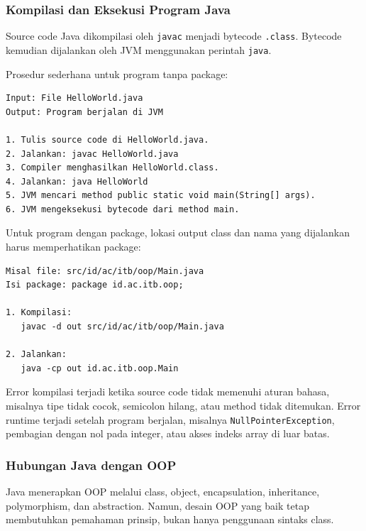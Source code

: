 \subsubsection{Kompilasi dan Eksekusi Program Java}

\begin{jawab}
Source code Java dikompilasi oleh \texttt{javac} menjadi bytecode \texttt{.class}. Bytecode kemudian dijalankan oleh JVM menggunakan perintah \texttt{java}.
\end{jawab}

Prosedur sederhana untuk program tanpa package:

\begin{lstlisting}[caption={Kompilasi dan eksekusi program tanpa package}, label={lst:compile-simple}]
Input: File HelloWorld.java
Output: Program berjalan di JVM

1. Tulis source code di HelloWorld.java.
2. Jalankan: javac HelloWorld.java
3. Compiler menghasilkan HelloWorld.class.
4. Jalankan: java HelloWorld
5. JVM mencari method public static void main(String[] args).
6. JVM mengeksekusi bytecode dari method main.
\end{lstlisting}

Untuk program dengan package, lokasi output class dan nama yang dijalankan harus memperhatikan package:

\begin{lstlisting}[caption={Kompilasi dan eksekusi program dengan package}, label={lst:compile-package}]
Misal file: src/id/ac/itb/oop/Main.java
Isi package: package id.ac.itb.oop;

1. Kompilasi:
   javac -d out src/id/ac/itb/oop/Main.java

2. Jalankan:
   java -cp out id.ac.itb.oop.Main
\end{lstlisting}

Error kompilasi terjadi ketika source code tidak memenuhi aturan bahasa, misalnya tipe tidak cocok, semicolon hilang, atau method tidak ditemukan. Error runtime terjadi setelah program berjalan, misalnya \texttt{NullPointerException}, pembagian dengan nol pada integer, atau akses indeks array di luar batas.

\subsubsection{Hubungan Java dengan OOP}

\begin{jawab}
Java menerapkan OOP melalui class, object, encapsulation, inheritance, polymorphism, dan abstraction. Namun, desain OOP yang baik tetap membutuhkan pemahaman prinsip, bukan hanya penggunaan sintaks class.
\end{jawab}


